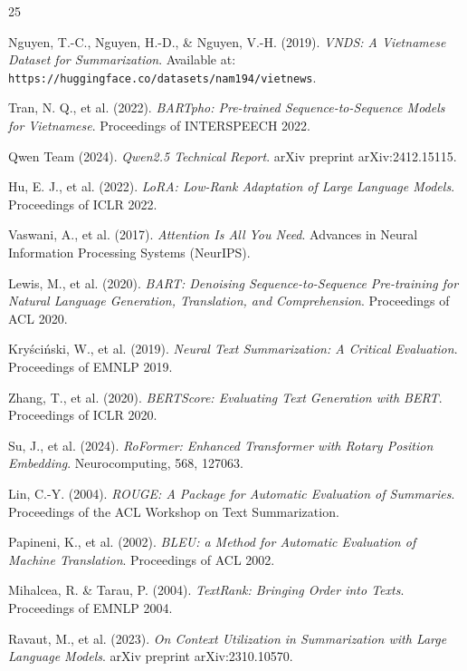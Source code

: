 \documentclass{article}
\begin{document}
\newpage
\renewcommand{\refname}{Tài liệu tham khảo}
\begin{thebibliography}{25}

Nguyen, T.-C., Nguyen, H.-D., \& Nguyen, V.-H. (2019).
\textit{VNDS: A Vietnamese Dataset for Summarization}.
Available at: \texttt{https://huggingface.co/datasets/nam194/vietnews}.

Tran, N. Q., et al. (2022).
\textit{BARTpho: Pre-trained Sequence-to-Sequence Models for Vietnamese}.
Proceedings of INTERSPEECH 2022.

Qwen Team (2024).
\textit{Qwen2.5 Technical Report}.
arXiv preprint arXiv:2412.15115.

Hu, E. J., et al. (2022).
\textit{LoRA: Low-Rank Adaptation of Large Language Models}.
Proceedings of ICLR 2022.

Vaswani, A., et al. (2017).
\textit{Attention Is All You Need}.
Advances in Neural Information Processing Systems (NeurIPS).

Lewis, M., et al. (2020).
\textit{BART: Denoising Sequence-to-Sequence Pre-training for Natural Language Generation, Translation, and Comprehension}.
Proceedings of ACL 2020.

Kryściński, W., et al. (2019).
\textit{Neural Text Summarization: A Critical Evaluation}.
Proceedings of EMNLP 2019.

Zhang, T., et al. (2020).
\textit{BERTScore: Evaluating Text Generation with BERT}.
Proceedings of ICLR 2020.

Su, J., et al. (2024).
\textit{RoFormer: Enhanced Transformer with Rotary Position Embedding}.
Neurocomputing, 568, 127063.

Lin, C.-Y. (2004).
\textit{ROUGE: A Package for Automatic Evaluation of Summaries}.
Proceedings of the ACL Workshop on Text Summarization.

Papineni, K., et al. (2002).
\textit{BLEU: a Method for Automatic Evaluation of Machine Translation}.
Proceedings of ACL 2002.

Mihalcea, R. \& Tarau, P. (2004).
\textit{TextRank: Bringing Order into Texts}.
Proceedings of EMNLP 2004.

Ravaut, M., et al. (2023).
\textit{On Context Utilization in Summarization with Large Language Models}.
arXiv preprint arXiv:2310.10570.


\end{thebibliography}
\end{document}
